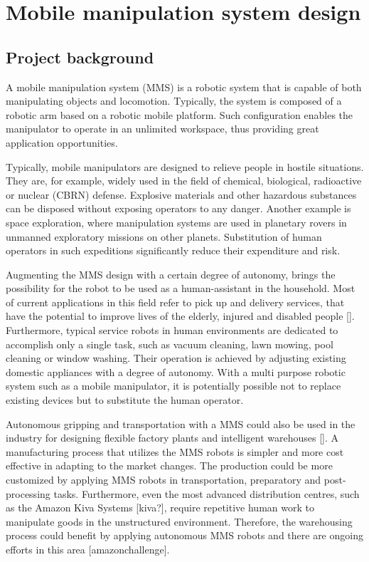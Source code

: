 \chapter{Mobile manipulation system design}
\label{cha:mmsdesign}


\section{Project background}
\label{sec:background}

A mobile manipulation system (MMS) is a robotic system that is capable of both manipulating objects and locomotion. Typically, the system is composed of a robotic arm based on a robotic mobile platform. Such configuration enables the manipulator to operate in an unlimited workspace, thus providing great application opportunities.

Typically, mobile manipulators are designed to relieve people in hostile situations. They are, for example, widely used in the field of chemical, biological, radioactive or nuclear (CBRN) defense. Explosive materials and other hazardous substances can be disposed without exposing operators to any danger. Another example is space exploration, where manipulation systems are used in planetary rovers in unmanned exploratory missions on other planets. Substitution of human operators in such expeditions significantly reduce their expenditure and risk.

Augmenting the MMS design with a certain degree of autonomy, brings the possibility for the robot to be used as a human-assistant in the household. Most of current applications in this field refer to pick up and delivery services, that have the potential to improve lives of the elderly, injured and disabled people []. Furthermore, typical service robots in human environments are dedicated to accomplish only a single task, such as vacuum cleaning, lawn mowing, pool cleaning or window washing. Their operation is achieved by adjusting existing domestic appliances with a degree of autonomy. With a multi purpose robotic system such as a mobile manipulator, it is potentially possible not to replace existing devices but to substitute the human operator. 

Autonomous gripping and transportation with a MMS could also be used in the industry for designing flexible factory plants and intelligent warehouses []. A manufacturing process that utilizes the MMS robots is simpler and more cost effective in adapting to the market changes. The production could be more customized by applying MMS robots in transportation, preparatory and post-processing tasks. Furthermore, even the most advanced distribution centres, such as the Amazon Kiva Systems [kiva?], require repetitive human work to manipulate goods in the unstructured environment. Therefore, the warehousing process could benefit by applying autonomous MMS robots and there are ongoing efforts in this area [amazonchallenge].


